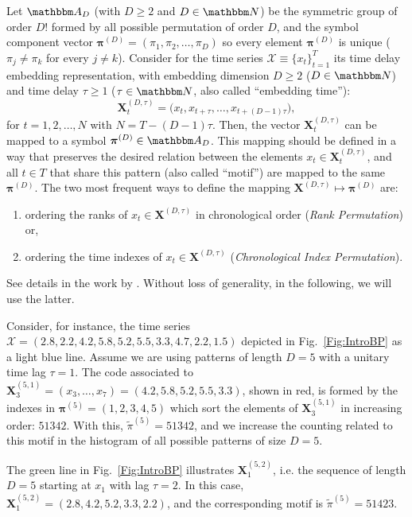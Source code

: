 \documentclass[alpha-refs]{wiley-article}
\begin{document}
Let ${\mathbbm A}_{D}$ (with $D \geq 2$ and $D \in {\mathbbm N}$) be the symmetric group of order $D!$ formed by all 
possible permutation of order $D$, and the symbol component vector 
${\bm \pi}^{(D)} = (\pi_1, \pi_2, \dots, \pi_D)$ so every element ${\bm \pi}^{(D)}$ is unique 
($\pi_j \neq \pi_k$ for every $j \neq k$). 
Consider for the time series ${\mathcal X} \equiv \{x_t\}_{t=1}^{T}$ its time delay embedding representation,
with embedding dimension $D \geq 2$ ($D \in {\mathbbm N}$) and time delay $\tau \geq 1$ ($\tau \in {\mathbbm N}$, also called ``embedding time''):
\begin{equation} 
{\mathbf X}^{(D,\tau)}_t =\big( x_t,x_{t+\tau},\dots,x_{t+(D-1)\tau} \big) ,
\label{eq:time-delay}
\end{equation} 
for $t = 1,2,\dots,N$ with $N = T-(D-1) \tau$.
Then, the vector ${\mathbf X}^{(D,\tau)}_t$ can be mapped to a symbol ${\bm \pi}^{(D)} \in {\mathbbm A}_{D}$. 
This mapping should be defined in a way that preserves the desired relation between the elements 
$x_t  \in {\mathbf X}^{(D,\tau)}_t$, and all $t \in T$ that share this pattern (also called ``motif'') are mapped to the same 
${\bm \pi}^{(D)}$. 
The two most frequent ways to define the mapping ${\mathbf X}^{(D,\tau)} \mapsto {\bm \pi}^{(D)}$ are:  
\begin{enumerate}[label=\alph*)]
\item ordering the ranks of $x_t \in {\mathbf X}^{(D,\tau)}$ in chronological order 
(\textit{Rank Permutation}) or,
\item ordering the time indexes of $x_t \in {\mathbf X}^{(D,\tau)}$  
(\textit{Chronological Index Permutation}).
\end{enumerate}
See details in the work by \citet{BPRepeatedValuesChaos}.
Without loss of generality, in the following, we will use the latter.

Consider, for instance, the time series $\mathcal X = (2.8, 2.2, 4.2, 5.8, 5.2, 5.5, 3.3, 4.7, 2.2, 1.5)$ depicted in Fig.~\ref{Fig:IntroBP} as a light blue line.
Assume we are using patterns of length $D=5$ with a unitary time lag $\tau=1$.
The code associated to $\mathbf X_{3}^{(5,1)}=(x_3,\dots,x_7)=(4.2, 5.8, 5.2, 5.5, 3.3)$, shown in red, is formed by the indexes in $\bm\pi^{(5)}=(1,2,3,4,5)$ which sort the elements of $\mathbf X_{3}^{(5,1)}$ in increasing order: $51342$.
With this, $\widetilde{\pi}^{(5)} = 51342$, and we increase the counting related to this motif in the histogram of all possible patterns of size $D=5$.

The green line in Fig.~\ref{Fig:IntroBP} illustrates $\mathbf X_{1}^{(5,2)}$, i.e. the sequence of length $D=5$ starting at $x_1$ with lag $\tau=2$.
In this case, $\mathbf X_{1}^{(5,2)}= (2.8, 4.2, 5.2, 3.3, 2.2)$, and the corresponding motif is $\widetilde{\pi}^{(5)}=51423$.
\end{document}
